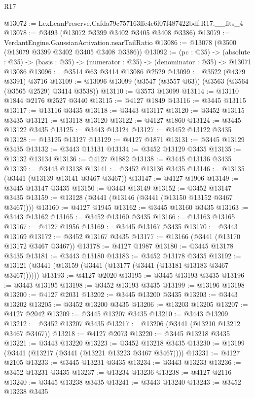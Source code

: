 \begin{lexlean}{R17}
\begin{coremodule}
@13072 := LexLeanPreserve.Cafda79c757163ffe4c6f07f487422bdf.R17.__fits_4
@13078 := @3493 (@13072 @3399 @3402 @3405 @3408 @3386)
@13079 := VerdantEngine.GaussianActivation.nearTailRatio
@13086 := @13078 (@3500 (@13079 @3399 @3402 @3405 @3408 @3386))
@13092 := (pc : @35) ->
  (absolute : @35) -> (basis : @35) -> (numerator : @35) -> (denominator : @35) -> @13071 @13086
@13096 := @3514 @63 @3414 @13086 @2529
@13099 := @3522 (@4379 @3391) @3716
@13109 := @13096 @13099 (@3547 (@3557 @63)) (@3563 (@3564 (@3565 @2529) @3414 @3538))
@13110 := @3573 @13099
@13114 := @13110 @1844 @2176 @2527 @3440
@13115 := @4127 @1849
@13116 := @3445 @13115
@13117 := @13116 @3435
@13118 := @3443 @13117
@13120 := @3452 @13115 @3435
@13121 := @13118 @13120
@13122 := @4127 @1860
@13124 := @3445 @13122 @3435
@13125 := @3443 @13124
@13127 := @3452 @13122 @3435
@13128 := @13125 @13127
@13129 := @4127 @1871
@13131 := @3445 @13129 @3435
@13132 := @3443 @13131
@13134 := @3452 @13129 @3435
@13135 := @13132 @13134
@13136 := @4127 @1882
@13138 := @3445 @13136 @3435
@13139 := @3443 @13138
@13141 := @3452 @13136 @3435
@13146 := @13135 (@3441 (@13139 @13141 @3467 @3467))
@13147 := @4127 @1906
@13149 := @3445 @13147 @3435
@13150 := @3443 @13149
@13152 := @3452 @13147 @3435
@13159 := @13128 (@3441 (@13146 (@3441 (@13150 @13152 @3467 @3467))))
@13160 := @4127 @1945
@13162 := @3445 @13160 @3435
@13163 := @3443 @13162
@13165 := @3452 @13160 @3435
@13166 := @13163 @13165
@13167 := @4127 @1956
@13169 := @3445 @13167 @3435
@13170 := @3443 @13169
@13172 := @3452 @13167 @3435
@13177 := @13166 (@3441 (@13170 @13172 @3467 @3467))
@13178 := @4127 @1987
@13180 := @3445 @13178 @3435
@13181 := @3443 @13180
@13183 := @3452 @13178 @3435
@13192 := @13121 (@3441 (@13159 (@3441 (@13177 (@3441 (@13181 @13183 @3467 @3467))))))
@13193 := @4127 @2020
@13195 := @3445 @13193 @3435
@13196 := @3443 @13195
@13198 := @3452 @13193 @3435
@13199 := @13196 @13198
@13200 := @4127 @2031
@13202 := @3445 @13200 @3435
@13203 := @3443 @13202
@13205 := @3452 @13200 @3435
@13206 := @13203 @13205
@13207 := @4127 @2042
@13209 := @3445 @13207 @3435
@13210 := @3443 @13209
@13212 := @3452 @13207 @3435
@13217 := @13206 (@3441 (@13210 @13212 @3467 @3467))
@13218 := @4127 @2073
@13220 := @3445 @13218 @3435
@13221 := @3443 @13220
@13223 := @3452 @13218 @3435
@13230 := @13199 (@3441 (@13217 (@3441 (@13221 @13223 @3467 @3467))))
@13231 := @4127 @2105
@13233 := @3445 @13231 @3435
@13234 := @3443 @13233
@13236 := @3452 @13231 @3435
@13237 := @13234 @13236
@13238 := @4127 @2116
@13240 := @3445 @13238 @3435
@13241 := @3443 @13240
@13243 := @3452 @13238 @3435

\end{coremodule}
\end{lexlean}
